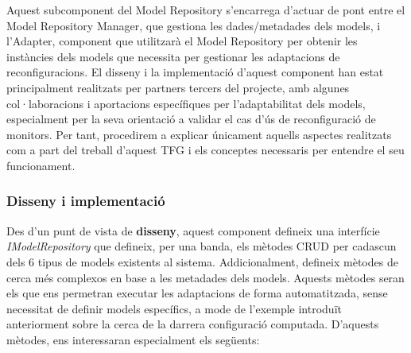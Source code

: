 Aquest subcomponent del Model Repository s'encarrega d'actuar de pont entre el Model Repository Manager, que gestiona les dades/metadades dels models, i l'Adapter, component que utilitzarà el Model Repository per obtenir les instàncies dels models que necessita per gestionar les adaptacions de reconfiguracions. El disseny i la implementació d'aquest component han estat principalment realitzats per partners tercers del projecte, amb algunes col·laboracions i aportacions específiques per l'adaptabilitat dels models, especialment per la seva orientació a validar el cas d'ús de reconfiguració de monitors. Per tant, procedirem a explicar únicament aquells aspectes realitzats com a part del treball d'aquest TFG i els conceptes necessaris per entendre el seu funcionament.\\

\subsubsection{Disseny i implementació}

Des d'un punt de vista de \textbf{disseny}, aquest component defineix una interfície \textit{IModelRepository} que defineix, per una banda, els mètodes CRUD per cadascun dels 6 tipus de models existents al sistema. Addicionalment, defineix mètodes de cerca més complexos en base a les metadades dels models. Aquests mètodes seran els que ens permetran executar les adaptacions de forma automatitzada, sense necessitat de definir models específics, a mode de l'exemple introduït anteriorment sobre la cerca de la darrera configuració computada. D'aquests mètodes, ens interessaran especialment els següents:

